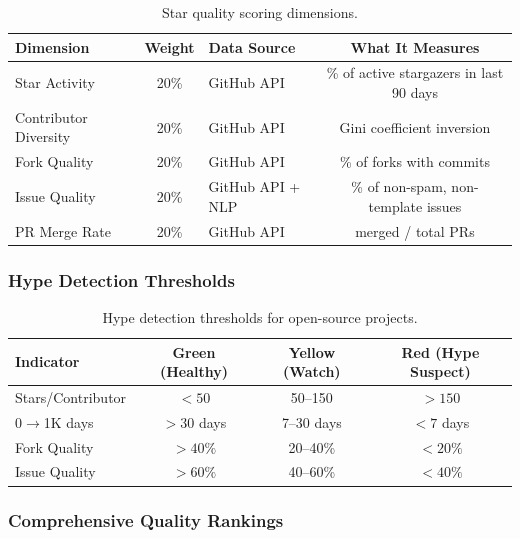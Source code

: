 \begin{table}[htbp]
\centering
\caption{Star quality scoring dimensions.}
\label{tab:star-dimensions}
\begin{tabular}{lclc}
\toprule
\textbf{Dimension} & \textbf{Weight} & \textbf{Data Source} & \textbf{What It Measures} \\
\midrule
Star Activity & 20\% & GitHub API & \% of active stargazers in last 90 days \\
Contributor Diversity & 20\% & GitHub API & Gini coefficient inversion \\
Fork Quality & 20\% & GitHub API & \% of forks with commits \\
Issue Quality & 20\% & GitHub API + NLP & \% of non-spam, non-template issues \\
PR Merge Rate & 20\% & GitHub API & merged / total PRs \\
\bottomrule
\end{tabular}
\end{table}

\subsubsection{Hype Detection Thresholds}

\begin{table}[htbp]
\centering
\caption{Hype detection thresholds for open-source projects.}
\label{tab:hype-thresholds}
\begin{tabular}{lccc}
\toprule
\textbf{Indicator} & \textbf{Green (Healthy)} & \textbf{Yellow (Watch)} & \textbf{Red (Hype Suspect)} \\
\midrule
Stars/Contributor & $< 50$ & 50--150 & $> 150$ \\
0$\to$1K days & $> 30$ days & 7--30 days & $< 7$ days \\
Fork Quality & $> 40\%$ & 20--40\% & $< 20\%$ \\
Issue Quality & $> 60\%$ & 40--60\% & $< 40\%$ \\
\bottomrule
\end{tabular}
\end{table}

\subsubsection{Comprehensive Quality Rankings}

